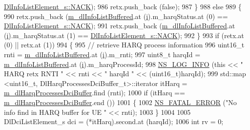 \begin{DoxyCode}
      \hyperlink{structns3_1_1DlInfoListElement__s_a3e55b89f756b7bd8909c8116a202a17aaf90e76e67c86729b4ee21927b7fb1770}{DlInfoListElement\_s::NACK});
986           retx.push\_back (\textcolor{keyword}{false});
987         \}
988       \textcolor{keywordflow}{else}
989         \{
990           retx.push\_back (\hyperlink{classns3_1_1CqaFfMacScheduler_aabc929a8c1c30338a5fa0826bb7cd2b8}{m\_dlInfoListBuffered}.at (\hyperlink{bernuolliDistribution_8m_a6f6ccfcf58b31cb6412107d9d5281426}{i}).m\_harqStatus.at (0) == 
      \hyperlink{structns3_1_1DlInfoListElement__s_a3e55b89f756b7bd8909c8116a202a17aaf90e76e67c86729b4ee21927b7fb1770}{DlInfoListElement\_s::NACK});
991           retx.push\_back (\hyperlink{classns3_1_1CqaFfMacScheduler_aabc929a8c1c30338a5fa0826bb7cd2b8}{m\_dlInfoListBuffered}.at (\hyperlink{bernuolliDistribution_8m_a6f6ccfcf58b31cb6412107d9d5281426}{i}).m\_harqStatus.at (1) == 
      \hyperlink{structns3_1_1DlInfoListElement__s_a3e55b89f756b7bd8909c8116a202a17aaf90e76e67c86729b4ee21927b7fb1770}{DlInfoListElement\_s::NACK});
992         \}
993       \textcolor{keywordflow}{if} (retx.at (0) || retx.at (1))
994         \{
995           \textcolor{comment}{// retrieve HARQ process information}
996           uint16\_t rnti = \hyperlink{classns3_1_1CqaFfMacScheduler_aabc929a8c1c30338a5fa0826bb7cd2b8}{m\_dlInfoListBuffered}.at (\hyperlink{bernuolliDistribution_8m_a6f6ccfcf58b31cb6412107d9d5281426}{i}).m\_rnti;
997           uint8\_t harqId = \hyperlink{classns3_1_1CqaFfMacScheduler_aabc929a8c1c30338a5fa0826bb7cd2b8}{m\_dlInfoListBuffered}.at (\hyperlink{bernuolliDistribution_8m_a6f6ccfcf58b31cb6412107d9d5281426}{i}).m\_harqProcessId;
998           \hyperlink{group__logging_gafbd73ee2cf9f26b319f49086d8e860fb}{NS\_LOG\_INFO} (\textcolor{keyword}{this} << \textcolor{stringliteral}{" HARQ retx RNTI "} << rnti << \textcolor{stringliteral}{" harqId "} << (uint16\_t)harqId);
999           std::map <uint16\_t, DlHarqProcessesDciBuffer\_t>::iterator itHarq = 
      \hyperlink{classns3_1_1CqaFfMacScheduler_a4de0e4833545b31fcb31f77492a34380}{m\_dlHarqProcessesDciBuffer}.find (rnti);
1000           \textcolor{keywordflow}{if} (itHarq == \hyperlink{classns3_1_1CqaFfMacScheduler_a4de0e4833545b31fcb31f77492a34380}{m\_dlHarqProcessesDciBuffer}.end ())
1001             \{
1002               \hyperlink{group__fatal_ga5131d5e3f75d7d4cbfd706ac456fdc85}{NS\_FATAL\_ERROR} (\textcolor{stringliteral}{"No info find in HARQ buffer for UE "} << rnti);
1003             \}
1004 
1005           DlDciListElement\_s dci = (*itHarq).second.at (harqId);
1006           \textcolor{keywordtype}{int} rv = 0;

\end{DoxyCode}
